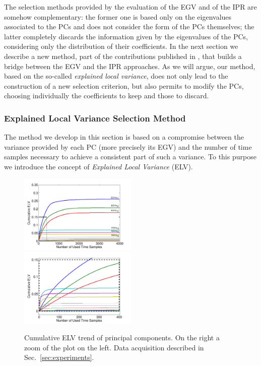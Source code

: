 The selection methods provided by the evaluation of the EGV and of the IPR are somehow complementary: the former one is based only on the eigenvalues associated to the PCs and does not consider the form of the PCs themselves; the latter completely discards the information given by the eigenvalues of the PCs, considering only the distribution of their coefficients. In the next section we describe a new method, part of the contributions published in \cite{Cagli2016}, that builds a bridge between the EGV and the IPR approaches. As we will argue, our method, based on the so-called {\em explained local variance}, does not only lead to the construction of a new selection criterion, but also permits  to modify the PCs, choosing individually the coefficients to keep and those to discard. 

\subsubsection{Explained Local Variance Selection Method}\label{sec:ELVmethod}
The method we develop in this section is based on a compromise between the variance provided by each PC (more precisely its EGV) and the number of time samples necessary to achieve a consistent part of such a variance. To this purpose we  introduce the concept of {\em Explained Local Variance} (ELV).
\begin{figure}
\includegraphics[width=0.5\textwidth]{../Figures/CARDIS2015/cumulativeELVallRectangle.pdf} 
\includegraphics[width=0.5\textwidth]{../Figures/CARDIS2015/cumulativeELVzoomedRectangle.pdf} 
\caption[Cumulative ELV trend of principal components.]{Cumulative ELV trend of principal components. On the right a zoom of the plot on the left. Data acquisition described in Sec.~\ref{sec:experiments}.}\label{fig:ELVcumulative}
\end{figure}
